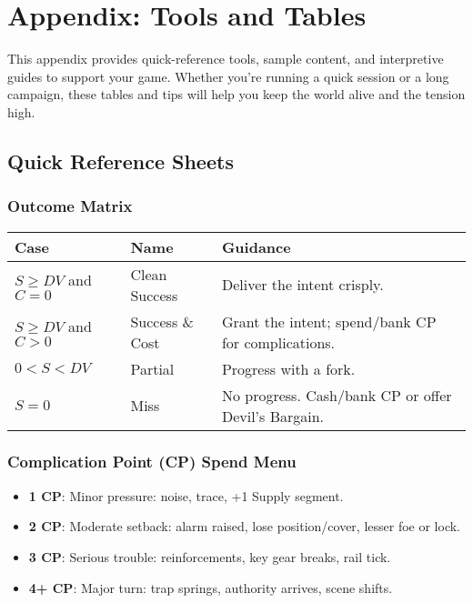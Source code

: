 
\chapter{Appendix: Tools and Tables}

This appendix provides quick-reference tools, sample content, and interpretive guides to support your game. Whether you're running a quick session or a long campaign, these tables and tips will help you keep the world alive and the tension high.

\section*{Quick Reference Sheets}

\subsection*{Outcome Matrix}

\begin{center}
\begin{tabular}{lll}
\toprule
\textbf{Case} & \textbf{Name} & \textbf{Guidance} \\
\midrule
$S \geq DV$ and $C = 0$ & Clean Success & Deliver the intent crisply. \\
$S \geq DV$ and $C > 0$ & Success \& Cost & Grant the intent; spend/bank CP for complications. \\
$0 < S < DV$ & Partial & Progress with a fork. \\
$S = 0$ & Miss & No progress. Cash/bank CP or offer Devil's Bargain. \\
\bottomrule
\end{tabular}
\end{center}

\subsection*{Complication Point (CP) Spend Menu}

\begin{itemize}
    \item \textbf{1 CP}: Minor pressure: noise, trace, +1 Supply segment.
    \item \textbf{2 CP}: Moderate setback: alarm raised, lose position/cover, lesser foe or lock.
    \item \textbf{3 CP}: Serious trouble: reinforcements, key gear breaks, rail tick.
    \item \textbf{4+ CP}: Major turn: trap springs, authority arrives, scene shifts.
\end{itemize}

